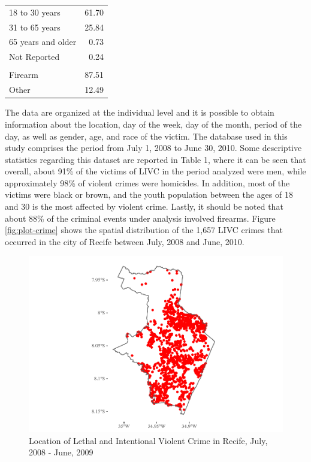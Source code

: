 \documentclass[smallextended]{svjour3}       %
\begin{document}
\begin{table}
\begin{tabular}[t]{lr}
\hspace{1em}18 to 30 years & 61.70\\
\hspace{1em}31 to 65 years & 25.84\\
\hspace{1em}65 years and older & 0.73\\
\hspace{1em}Not Reported & 0.24\\
\addlinespace[0.3em]
\multicolumn{2}{l}{\textbf{Weapon Used}}\\
\hspace{1em}Firearm & 87.51\\
\hspace{1em}Other & 12.49\\
\bottomrule
\end{tabular}
\end{table}

The data are organized at the individual level and it is possible to
obtain information about the location, day of the week, day of the
month, period of the day, as well as gender, age, and race of the
victim. The database used in this study comprises the period from July
1, 2008 to June 30, 2010. Some descriptive statistics regarding this
dataset are reported in Table 1, where it can be seen that overall,
about 91\% of the victims of LIVC in the period analyzed were men, while
approximately 98\% of violent crimes were homicides. In addition, most
of the victims were black or brown, and the youth population between the
ages of 18 and 30 is the most affected by violent crime. Lastly, it
should be noted that about 88\% of the criminal events under analysis
involved firearms. Figure \ref{fig:plot-crime} shows the spatial
distribution of the 1,657 LIVC crimes that occurred in the city of
Recife between July, 2008 and June, 2010.

\begin{figure}

\includegraphics{Moral_Communities_and_Crime_v1_files/figure-latex/fig-plot-crime-1} \hfill{}

\caption{\label{fig:plot-crime}Location of Lethal and Intentional Violent Crime in Recife, July, 2008 - June, 2009}\label{fig:fig-plot-crime}
\end{figure}
\end{document}
